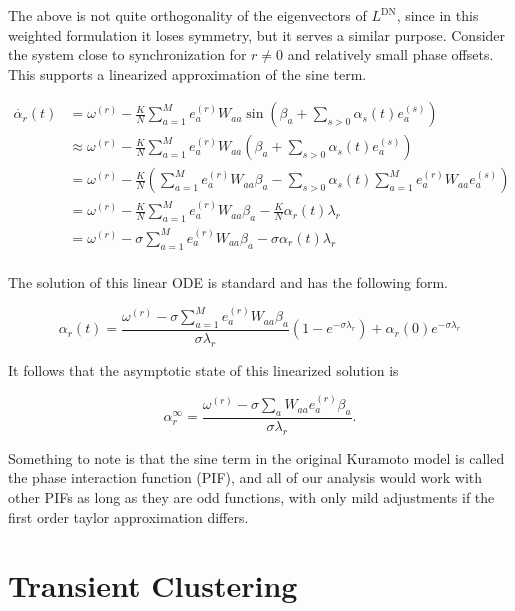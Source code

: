 \documentclass[%
 aip,
 amsmath,amssymb,
preprint,
reprint, onecolumn %
]{revtex4-1}
\begin{document}
    The above is not quite orthogonality of the eigenvectors of $L^\text{DN}$, since in this weighted formulation it loses symmetry, but it serves a similar purpose. Consider the system close to synchronization for $r\not=0$ and relatively small phase offsets. This supports a linearized approximation of the sine term.

    \begin{align*}
        \dot{\alpha_r}(t)&=\omega^{(r)}-\frac{K}{N}\sum_{a=1}^M e^{(r)}_a W_{aa} \sin\left(\beta_a + \sum_{s>0} \alpha_s(t) e_a^{(s)}\right)\\
        &\approx \omega^{(r)}-\frac{K}{N}\sum_{a=1}^M e^{(r)}_a W_{aa} \left(\beta_a + \sum_{s>0} \alpha_s(t) e_a^{(s)}\right)\\
        &= \omega^{(r)}-\frac{K}{N}\left(\sum_{a=1}^M  e^{(r)}_a W_{aa} \beta_a - \sum_{s>0}\alpha_s(t)\sum_{a=1}^M  e^{(r)}_a W_{aa}   e_a^{(s)}\right)\\
        &=\omega^{(r)}- \frac{K}{N} \sum_{a=1}^M  e^{(r)}_a W_{aa} \beta_a -\frac{K}{N}\alpha_r(t)  \lambda_{r}\\
        &=\omega^{(r)}- \sigma \sum_{a=1}^M  e^{(r)}_a W_{aa} \beta_a -\sigma\alpha_r(t)  \lambda_{r}\\
    \end{align*}
    
    The solution of this linear ODE is standard and has the following form.
    
    \[
    \alpha_r(t) = \frac{\omega^{(r)} - \sigma \sum_{a=1}^M  e^{(r)}_a W_{aa} \beta_a}{\sigma \lambda_r} \left(1-e^{-\sigma \lambda_r}\right) + \alpha_r(0) e^{-\sigma \lambda_r}
    \]
    
    It follows that the asymptotic state of this linearized solution is
    
    \[
    \alpha_r^{\infty} =\frac{\omega^{(r)}-\sigma \sum_{a}W_{aa}e_a^{(r)}\beta_{a}}{\sigma \lambda_r}.
    \]

    Something to note is that the sine term in the original Kuramoto model is called the phase interaction function (PIF),\cite{breakspear_generative_2010} and all of our analysis would work with other PIFs as long as they are odd functions, with only mild adjustments if the first order taylor approximation differs.


    

\section{Transient Clustering}\label{apdx:transient}
\end{document}
